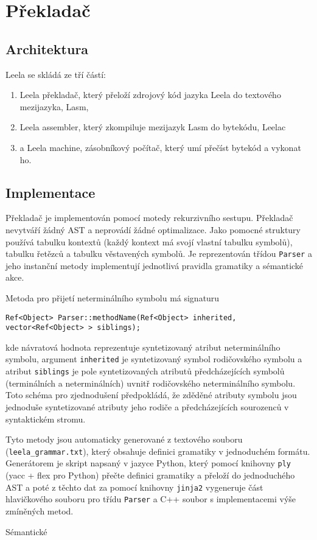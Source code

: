\documentclass[10pt,a4paper]{article}
\begin{document}
\section{Překladač}
\label{sec:prekladac}

\subsection{Architektura}

Leela se skládá ze tří částí:
\begin{enumerate}
\item Leela překladač, který přeloží zdrojový kód jazyka Leela do textového mezijazyka, Lasm,
\item Leela assembler, který zkompiluje mezijazyk Lasm do bytekódu, Leelac
\item a Leela machine, zásobníkový počítač, který umí přečíst bytekód a vykonat ho.
\end{enumerate}

\subsection{Implementace}

Překladač je implementován pomocí motedy rekurzivního sestupu. Překladač
nevytváří žádný AST a neprovádí žádné optimalizace. Jako pomocné struktury
používá tabulku kontextů (každý kontext má svojí vlastní tabulku symbolů),
tabulku řetězců a tabulku věstavených symbolů. Je reprezentován třídou
\texttt{Parser} a jeho instanční metody implementují jednotlivá pravidla
gramatiky a sémantické akce. 

Metoda pro přijetí neterminálního symbolu má signaturu
\begin{lstlisting}
Ref<Object> Parser::methodName(Ref<Object> inherited, vector<Ref<Object> > siblings);
\end{lstlisting}
kde návratová hodnota reprezentuje syntetizovaný atribut neterminálního
symbolu, argument \texttt{inherited} je syntetizovaný symbol rodičovského symbolu
a atribut \texttt{siblings} je pole syntetizovaných atributů předcházejících
symbolů (terminálních a neterminálních) uvnitř rodičovského neterminálního
symbolu. Toto schéma pro zjednodušení předpokládá, že zděděné atributy symbolu
jsou jednoduše syntetizované atributy jeho rodiče a předcházejících sourozenců
v syntaktickém stromu.

Tyto metody jsou automaticky generované z textového souboru
(\verb"leela_grammar.txt"), který obsahuje definici gramatiky v jednoduchém
formátu. Generátorem je skript napsaný v jazyce Python, který pomocí knihovny
\texttt{ply} (yacc + flex pro Python) přečte definici gramatiky a přeloží do
jednoduchého AST a poté z těchto dat za pomocí knihovny \texttt{jinja2}
vygeneruje část hlavičkového souboru pro třídu \texttt{Parser} a C++ soubor s
implementacemi výše zmíněných metod.

Sémantické 
\end{document}
